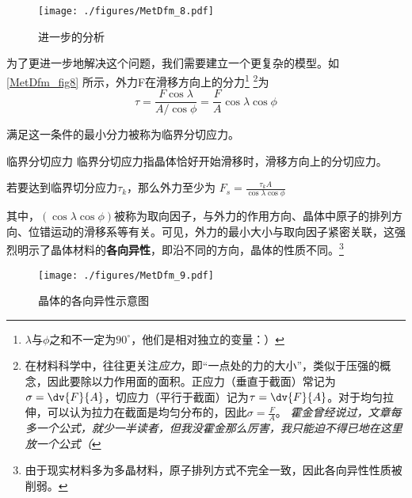 \begin{figure}[ht]
\centering
\texttt{[image: ./figures/MetDfm\_8.pdf]}
\caption{进一步的分析} \label{MetDfm_fig8}
\end{figure}
为了更进一步地解决这个问题，我们需要建立一个更复杂的模型。如\autoref{MetDfm_fig8} 所示，外力F在滑移方向上的分力\footnote{$\lambda$与$\phi$之和不一定为$90^\circ$，他们是相对独立的变量：）} \footnote{在材料科学中，往往更关注\textsl{应力}，即“一点处的力的大小”，类似于压强的概念，因此要除以力作用面的面积。正应力（垂直于截面）常记为$\sigma=\dv{F}{A}$，切应力（平行于截面）记为$\tau=\dv{F}{A}$。对于均匀拉伸，可以认为拉力在截面是均匀分布的，因此$\sigma=\frac{F}{A}$。 \textsl{霍金曾经说过，文章每多一个公式，就少一半读者，但我没霍金那么厉害，我只能迫不得已地在这里放一个公式（}}为
\begin{equation}
\tau=\frac{F \cos \lambda}{A/{\cos \phi}}=\frac{F}{A}{\cos \lambda}{\cos \phi}
\end{equation}

满足这一条件的最小分力被称为临界分切应力。

\begin{definition}{临界分切应力}
临界分切应力指晶体恰好开始滑移时，滑移方向上的分切应力。
\end{definition}

若要达到临界切分应力$\tau_k$，那么外力至少为 $F_s=\frac{\tau_k A}{\cos \lambda \cos \phi} $ 

其中，$(\cos \lambda \cos \phi)$被称为取向因子，与外力的作用方向、晶体中原子的排列方向、位错运动的滑移系等有关。可见，外力的最小大小与取向因子紧密关联，这强烈明示了晶体材料的\textbf{各向异性}，即沿不同的方向，晶体的性质不同。\footnote{由于现实材料多为多晶材料，原子排列方式不完全一致，因此各向异性性质被削弱。}

\begin{figure}[ht]
\centering
\texttt{[image: ./figures/MetDfm\_9.pdf]}
\caption{晶体的各向异性示意图} \label{MetDfm_fig9}
\end{figure}
